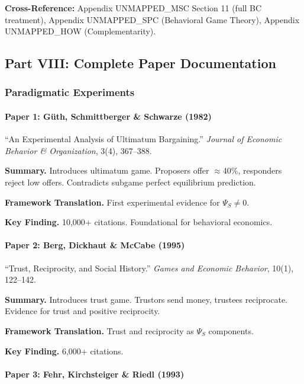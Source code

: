 \textbf{Cross-Reference:} Appendix UNMAPPED_MSC Section 11 (full BC treatment),
Appendix UNMAPPED_SPC (Behavioral Game Theory), Appendix UNMAPPED_HOW (Complementarity).

\subsection{Part VIII: Complete Paper Documentation}

\subsubsection{Paradigmatic Experiments}

\paragraph{Paper 1: Güth, Schmittberger \& Schwarze (1982)}

``An Experimental Analysis of Ultimatum Bargaining.''
\textit{Journal of Economic Behavior \& Organization}, 3(4), 367--388.

\textbf{Summary.}
Introduces ultimatum game. Proposers offer $\approx$40\%, responders reject 
low offers. Contradicts subgame perfect equilibrium prediction.

\textbf{Framework Translation.}
First experimental evidence for $\Psi_S \neq 0$.

\textbf{Key Finding.}
10,000+ citations. Foundational for behavioral economics.

\paragraph{Paper 2: Berg, Dickhaut \& McCabe (1995)}

``Trust, Reciprocity, and Social History.''
\textit{Games and Economic Behavior}, 10(1), 122--142.

\textbf{Summary.}
Introduces trust game. Trustors send money, trustees reciprocate.
Evidence for trust and positive reciprocity.

\textbf{Framework Translation.}
Trust and reciprocity as $\Psi_S$ components.

\textbf{Key Finding.}
6,000+ citations.

\paragraph{Paper 3: Fehr, Kirchsteiger \& Riedl (1993)}

